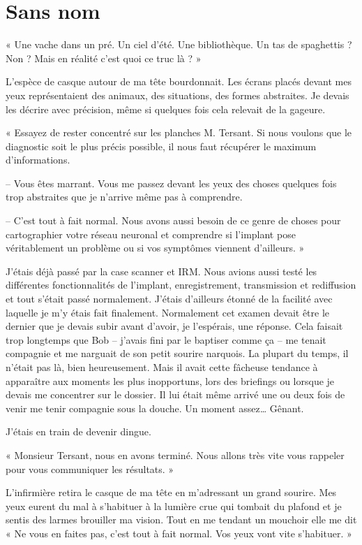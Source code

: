 \chapter{Sans nom}

« Une vache dans un pré. Un ciel d'été. Une bibliothèque. Un tas de spaghettis ? Non ? Mais en réalité c'est quoi ce
truc là ? »

L'espèce de casque autour de ma tête bourdonnait. Les écrans placés devant mes yeux représentaient des animaux, des 
situations, des formes abstraites. Je devais les décrire avec précision, même si quelques fois cela relevait de la
gageure.

« Essayez de rester concentré sur les planches M. Tersant. Si nous voulons que le diagnostic soit le plus précis
possible, il nous faut récupérer le maximum d'informations.

-- Vous êtes marrant. Vous me passez devant les yeux des choses quelques fois trop abstraites que je n'arrive même pas à
comprendre.

-- C'est tout à fait normal. Nous avons aussi besoin de ce genre de choses pour cartographier votre réseau neuronal et
comprendre si l'implant pose véritablement un problème ou si vos symptômes viennent d'ailleurs. »

J'étais déjà passé par la case scanner et IRM. Nous avions aussi testé les différentes fonctionnalités de l'implant,
enregistrement, transmission et rediffusion et tout s'était passé normalement. J'étais d'ailleurs étonné de la facilité
avec laquelle je m'y étais fait finalement. Normalement cet examen devait être le dernier que je devais subir avant 
d'avoir, je l'espérais, une réponse. Cela faisait trop longtemps que Bob -- j'avais fini par le baptiser comme ça -- me
tenait compagnie et me narguait de son petit sourire narquois. La plupart du temps, il n'était pas là, bien 
heureusement. Mais il avait cette fâcheuse tendance à apparaître aux moments les plus inopportuns, lors des briefings 
ou lorsque je devais me concentrer sur le dossier. Il lui était même arrivé une ou deux fois de venir me tenir 
compagnie sous la douche. Un moment assez… Gênant.

J'étais en train de devenir dingue.

« Monsieur Tersant, nous en avons terminé. Nous allons très vite vous rappeler pour vous communiquer les résultats. »

L'infirmière retira le casque de ma tête en m'adressant un grand sourire. Mes yeux eurent du mal à s'habituer à la
lumière crue qui tombait du plafond et je sentis des larmes brouiller ma vision. Tout en me tendant un mouchoir elle me
dit « Ne vous en faites pas, c'est tout à fait normal. Vos yeux vont vite s'habituer. »

